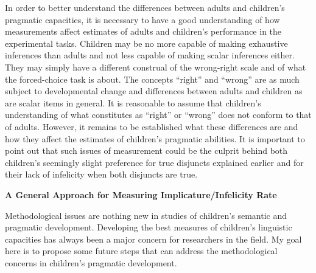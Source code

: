 \documentclass[oneside]{report}
\theoremstyle{definition}
\theoremstyle{definition}
\theoremstyle{definition}
\theoremstyle{remark}
\begin{document}
In order to better understand the differences between adults and
children's pragmatic capacities, it is necessary to have a good
understanding of how measurements affect estimates of adults and
children's performance in the experimental tasks. Children may be no
more capable of making exhaustive inferences than adults and not less
capable of making scalar inferences either. They may simply have a
different construal of the wrong-right scale and of what the
forced-choice task is about. The concepts ``right'' and ``wrong'' are as
much subject to developmental change and differences between adults and
children as are scalar items in general. It is reasonable to assume that
children's understanding of what constitutes as ``right'' or ``wrong''
does not conform to that of adults. However, it remains to be
established what these differences are and how they affect the estimates
of children's pragmatic abilities. It is important to point out that
such issues of measurement could be the culprit behind both children's
seemingly slight preference for true disjuncts explained earlier and for
their lack of infelicity when both disjuncts are true.

\textbf{A General Approach for Measuring Implicature/Infelicity Rate}

Methodological issues are nothing new in studies of children's semantic
and pragmatic development. Developing the best measures of children's
linguistic capacities has always been a major concern for researchers in
the field. My goal here is to propose some future steps that can address
the methodological concerns in children's pragmatic development.
\end{document}
